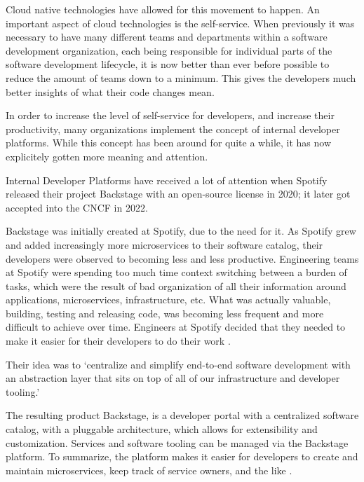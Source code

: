 Cloud native technologies have allowed for this movement to happen.
An important aspect of cloud technologies is the self-service.
When previously it was necessary to have many different teams and departments
within a software development organization,
each being responsible for individual parts of the 
software development lifecycle,
it is now better than ever before possible to reduce the amount of
teams down to a minimum.
This gives the developers much better insights of what their code changes mean.

In order to increase the level of self-service for developers,
and increase their productivity,
many organizations implement the concept of internal developer platforms.
While this concept has been around for quite a while,
it has now explicitely gotten more meaning and attention.

Internal Developer Platforms have received a lot of attention
when Spotify released their project Backstage
\autocite{backstageIOWebsite}
with an open-source license in 2020; it later got accepted into the CNCF in 2022.

%
Backstage was initially created at Spotify, due to the need for it.
As Spotify grew and added increasingly more microservices to their software catalog,
their developers were observed to becoming less and less productive.
Engineering teams at Spotify were spending too much time context switching between
a burden of tasks, which were the result of bad organization of all their
information around applications, microservices, infrastructure, etc.
What was actually valuable, building, testing and releasing code,
was becoming less frequent and more difficult to achieve over time.
Engineers at Spotify decided that they needed to make it easier 
for their developers to do their work
\autocite{backstageSpotifyStory}.

Their idea was to
\enquote*{centralize and simplify end-to-end software development
with an abstraction layer that sits on top of all of our infrastructure and developer tooling.}
\autocite{backstageSpotifyStory}

The resulting product Backstage,
is a developer portal with a centralized software catalog,
with a pluggable architecture,
which allows for extensibility and customization.
Services and software tooling can be managed via the Backstage platform.
To summarize, the platform makes it easier for developers to create and maintain
microservices, keep track of service owners, and the like
\autocite{backstageSpotifyStory}.

